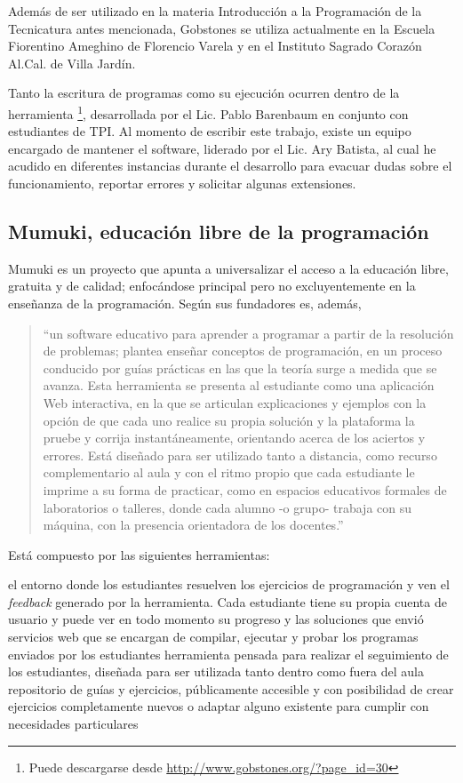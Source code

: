 Además de ser utilizado en la materia Introducción a la Programación de la Tecnicatura antes mencionada, Gobstones se utiliza actualmente en la Escuela Fiorentino Ameghino de Florencio Varela y en el Instituto Sagrado Corazón Al.Cal. de Villa Jardín.

Tanto la escritura de programas como su ejecución ocurren dentro de la herramienta \footnote{Puede descargarse desde \url{http://www.gobstones.org/?page_id=30}}, desarrollada por el Lic. Pablo Barenbaum en conjunto con estudiantes de TPI. Al momento de escribir este trabajo, existe un equipo encargado de mantener el software, liderado por el Lic. Ary Batista, al cual he acudido en diferentes instancias durante el desarrollo para evacuar dudas sobre el funcionamiento, reportar errores y solicitar algunas extensiones.

\subsection{Mumuki, educación libre de la programación}
Mumuki es un proyecto que apunta a universalizar el acceso a la educación libre, gratuita y de calidad; enfocándose principal pero no excluyentemente en la enseñanza de la programación. Según sus fundadores es, además,

\begin{quote}
``un software educativo para aprender a programar a partir de la resolución de problemas; plantea enseñar conceptos de programación, en un proceso conducido por guías prácticas en las que la teoría surge a medida que se avanza. Esta herramienta se presenta al estudiante como una aplicación Web interactiva, en la que se articulan explicaciones y ejemplos con la opción de que cada uno realice su propia solución y la plataforma la pruebe y corrija instantáneamente, orientando acerca de los aciertos y errores. Está diseñado para ser utilizado tanto a distancia, como recurso complementario al aula y con el ritmo propio que cada estudiante le imprime a su forma de practicar, como en espacios educativos formales de laboratorios o talleres, donde cada alumno -o grupo- trabaja con su máquina, con la presencia orientadora de los docentes.''\cite{PaperMumuki}
\end{quote}

Está compuesto por las siguientes herramientas:
\begin{itemize}
   el entorno donde los estudiantes resuelven los ejercicios de programación y ven el \textit{feedback} generado por la herramienta. Cada estudiante tiene su propia cuenta de usuario y puede ver en todo momento su progreso y las soluciones que envió
   servicios web que se encargan de compilar, ejecutar y probar los programas enviados por los estudiantes
   herramienta pensada para realizar el seguimiento de los estudiantes, diseñada para ser utilizada tanto dentro como fuera del aula
   repositorio de guías y ejercicios, públicamente accesible y con posibilidad de crear ejercicios completamente nuevos o adaptar alguno existente para cumplir con necesidades particulares
\end{itemize}


